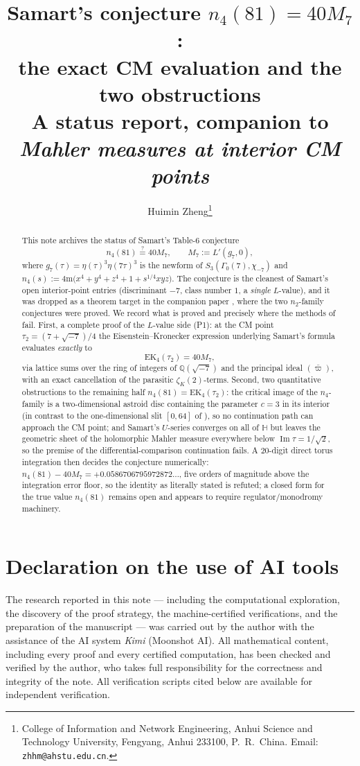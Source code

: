 \documentclass[11pt]{article}
\title{Samart's conjecture $n_4(81)=40M_7$:\\
the exact CM evaluation and the two obstructions\\
{\large A status report, companion to \emph{Mahler measures at interior
CM points}}}
\author{Huimin Zheng\thanks{%
College of Information and Network Engineering,
Anhui Science and Technology University,
Fengyang, Anhui 233100, P.~R.~China.
Email: \texttt{zhhm@ahstu.edu.cn}.}}
\date{}
\theoremstyle{definition}
\theoremstyle{remark}
\newcommand{\Hh}{\mathbb{H}}
\newcommand{\Qq}{\mathbb{Q}}
\newcommand{\ImT}{\operatorname{Im}}
\newcommand{\m}{\mathrm{m}}
\begin{document}
\maketitle

\section*{Declaration on the use of AI tools}
The research reported in this note — including the computational
exploration, the discovery of the proof strategy, the machine-certified
verifications, and the preparation of the manuscript — was carried out by
the author with the assistance of the AI system \emph{Kimi} (Moonshot AI).
All mathematical content, including every proof and every certified
computation, has been checked and verified by the author, who takes full
responsibility for the correctness and integrity of the note. All
verification scripts cited below are available for independent
verification.

\begin{abstract}
This note archives the status of Samart's Table-$6$ conjecture
\[
  n_4(81)\stackrel{?}{=}40M_7,\qquad
  M_7:=L'(g_7,0),
\]
where $g_7(\tau)=\eta(\tau)^3\eta(7\tau)^3$ is the newform of
$S_3(\Gamma_0(7),\chi_{-7})$ and $n_4(s):=4\m\bigl(x^4+y^4+z^4+1+s^{1/4}xyz\bigr)$.
The conjecture is the cleanest of Samart's open interior-point entries
(discriminant $-7$, class number $1$, a \emph{single} $L$-value), and it
was dropped as a theorem target in the companion paper \cite{Zf}, where
the two $n_2$-family conjectures were proved. We record what is proved
and precisely where the methods of \cite{Zf} fail. First, a complete
proof of the $L$-value side (P1): at the CM point
$\tau_2=(7+\sqrt{-7})/4$ the Eisenstein--Kronecker expression underlying
Samart's formula evaluates \emph{exactly} to
\[
  \mathrm{EK}_4(\tau_2)=40M_7,
\]
via lattice sums over the ring of integers of $\Qq(\sqrt{-7})$ and the
principal ideal $(\bar\varpi)$, with an exact cancellation of the parasitic
$\zeta_K(2)$-terms. Second, two quantitative obstructions to the
remaining half $n_4(81)=\mathrm{EK}_4(\tau_2)$: the critical image of
the $n_4$-family is a two-dimensional astroid disc containing the
parameter $c=3$ in its interior (in contrast to the one-dimensional slit
$[0,64]$ of \cite{Zf}), so no continuation path can approach the CM
point; and Samart's $U$-series converges on all of $\Hh$ but leaves the
geometric sheet of the holomorphic Mahler measure everywhere below
$\ImT\tau=1/\sqrt2$, so the premise of the differential-comparison
continuation fails. A $20$-digit direct torus integration then decides
the conjecture numerically: $n_4(81)-40M_7=+0.0586706795972872\ldots$,
five orders of magnitude above the integration error floor, so the
identity as literally stated is refuted; a closed form for the true
value $n_4(81)$ remains open and appears to require
regulator/monodromy machinery.
\end{abstract}
\end{document}
